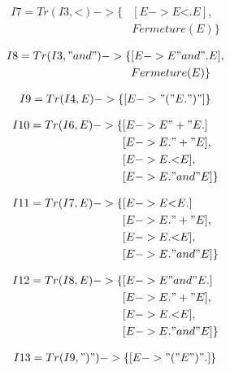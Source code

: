 \documentclass[a4paper,12pt]{article}
\begin{document}
\begin{align*}
I7 = Tr(I3, \text{<}) -> \{ & [E -> E \text{<} . E],\\
{} & Fermeture(E) \}
\end{align*}

\begin{align*}
I8 = Tr(I3, "and") -> \{ & [E -> E "and" . E],\\
{} & Fermeture(E) \}
\end{align*}

\begin{align*}
I9 = Tr(I4, E) -> \{ [E -> "(" E . ")"] \}
\end{align*}

\begin{align*}
I10 = Tr(I6, E) -> \{ & [E -> E "+" E .]\\
{} & [E -> E . "+" E],\\
{} & [E -> E . \text{<} E],\\
{} & [E -> E . "and" E] \}
\end{align*}

\begin{align*}
I11 = Tr(I7, E) -> \{ & [E -> E \text{<} E .]\\
{} & [E -> E . "+" E],\\
{} & [E -> E . \text{<} E],\\ 
{} & [E -> E . "and" E] \}
\end{align*}

\begin{align*}
I12 = Tr(I8, E) -> \{ & [E -> E "and" E .]\\
{} & [E -> E . "+" E],\\
{} & [E -> E . \text{<} E],\\ 
{} & [E -> E . "and" E] \}
\end{align*}

\begin{align*}
I13 = Tr(I9, ")") -> \{ [E -> "(" E ")" .] \}
\end{align*}

\newpage
\end{document}
